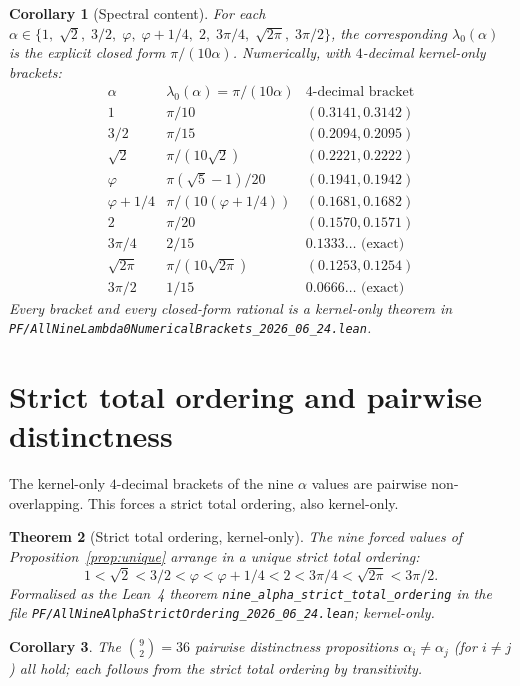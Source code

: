 \documentclass[11pt,a4paper]{amsart}
\theoremstyle{plain}
\newtheorem{theorem}{Theorem}[section]
\newtheorem{corollary}[theorem]{Corollary}
\theoremstyle{definition}
\begin{document}
\begin{corollary}[Spectral content]
For each $\alpha \in \{1,\;\sqrt{2},\;3/2,\;\varphi,\;\varphi+1/4,\;2,\;3\pi/4,\;\sqrt{2\pi},\;3\pi/2\}$, the corresponding $\lambda_0(\alpha)$ is the explicit closed form $\pi/(10\alpha)$. Numerically, with $4$-decimal kernel-only brackets:
\[
\renewcommand{\arraystretch}{1.15}
\begin{array}{l|l|l}
\alpha & \lambda_0(\alpha) = \pi/(10\alpha) & \text{4-decimal bracket} \\
\hline
1 & \pi/10 & (0.3141, 0.3142) \\
3/2 & \pi/15 & (0.2094, 0.2095) \\
\sqrt{2} & \pi/(10\sqrt{2}) & (0.2221, 0.2222) \\
\varphi & \pi(\sqrt{5}-1)/20 & (0.1941, 0.1942) \\
\varphi + 1/4 & \pi/(10(\varphi+1/4)) & (0.1681, 0.1682) \\
2 & \pi/20 & (0.1570, 0.1571) \\
3\pi/4 & 2/15 & 0.1333\ldots \text{ (exact)} \\
\sqrt{2\pi} & \pi/(10\sqrt{2\pi}) & (0.1253, 0.1254) \\
3\pi/2 & 1/15 & 0.0666\ldots \text{ (exact)}
\end{array}
\]
Every bracket and every closed-form rational is a kernel-only theorem in \texttt{PF/AllNineLambda0NumericalBrackets\_2026\_06\_24.lean}.
\end{corollary}

\section{Strict total ordering and pairwise distinctness}

The kernel-only $4$-decimal brackets of the nine $\alpha$ values are pairwise non-overlapping. This forces a strict total ordering, also kernel-only.

\begin{theorem}[Strict total ordering, kernel-only]\label{thm:order}
The nine forced values of Proposition~\ref{prop:unique} arrange in a unique strict total ordering:
\[
1 < \sqrt{2} < 3/2 < \varphi < \varphi + 1/4 < 2 < 3\pi/4 < \sqrt{2\pi} < 3\pi/2.
\]
Formalised as the Lean~4 theorem \texttt{nine\_alpha\_strict\_total\_ordering} in the file \texttt{PF/AllNineAlphaStrictOrdering\_2026\_06\_24.lean}; kernel-only.
\end{theorem}

\begin{corollary}
The $\binom{9}{2} = 36$ pairwise distinctness propositions $\alpha_i \neq \alpha_j$ (for $i \neq j$) all hold; each follows from the strict total ordering by transitivity.
\end{corollary}
\end{document}
